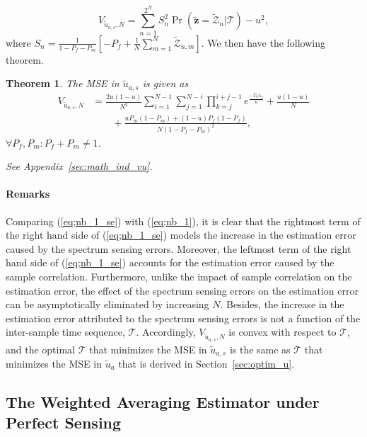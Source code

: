 \documentclass[11pt,draftclsnofoot,journal,onecolumn]{IEEEtran}
\newtheorem{theorem}{Theorem}
\begin{document}
\begin{equation}
V_{\tilde{u}_{a,s},N} = \sum_{n=1}^{2^N} S_n^2 \Pr(\tilde{\boldsymbol{z}} = \tilde{\mathcal{Z}}_n|\mathcal{T})-u^2,
\label{eq;u_var_1a}
\end{equation}
where $S_n = \frac{1}{1-P_f-P_m}\left[-P_f + \frac{1}{N} \sum_{m=1}^{N} \tilde{\mathcal{Z}}_{n,m}\right]$. We then have the following theorem.
\begin{theorem}
The MSE in $\tilde{u}_{a,s}$ is given as
\begin{align}
V_{\tilde{u}_{a,s},N} & = \frac{2u(1-u)}{N^2} \sum_{i=1}^{N-1} \sum_{j=1}^{N-i} \prod_{k=j}^{i+j-1} e^{\frac{-T_{k}\lambda_f}{u}}+ \frac{u(1-u)}{N}\nonumber\\&\qquad + \frac{uP_m\left(1-P_m\right) + \left(1-u\right)P_f\left(1-P_f\right)}{N\left(1-P_f-P_m\right)^2},
\label{eq;nb_1_se}
\end{align}
$\forall P_f, P_m: P_f+P_m\neq1$.
\begin{IEEEproof}
See Appendix~\ref{sec:math_ind_vu}.
\end{IEEEproof} 
\end{theorem}

\paragraph*{Remarks}

Comparing (\ref{eq;nb_1_se}) with (\ref{eq;nb_1}), it is clear that the rightmost term of the right hand side of (\ref{eq;nb_1_se}) models the increase in the estimation error caused by the spectrum sensing errors. Moreover, the leftmost term of the right hand side of (\ref{eq;nb_1_se}) accounts for the estimation error caused by the sample correlation. Furthermore, unlike the impact of sample correlation on the estimation error, the effect of the spectrum sensing errors on the estimation error can be asymptotically eliminated by increasing $N$. Besides, the increase in the estimation error attributed to the spectrum sensing errors is not a function of the inter-sample time sequence, $\mathcal{T}$. Accordingly, $V_{\tilde{u}_{a,s},N}$ is convex with respect to $\mathcal{T}$, and the optimal $\mathcal{T}$ that minimizes the MSE in $\tilde{u}_{a,s}$ is the same as $\mathcal{T}$ that minimizes the MSE in $\tilde{u}_{a}$ that is derived in Section~\ref{sec:optim_u}.

\subsection{The Weighted Averaging Estimator under Perfect Sensing}
\end{document}
